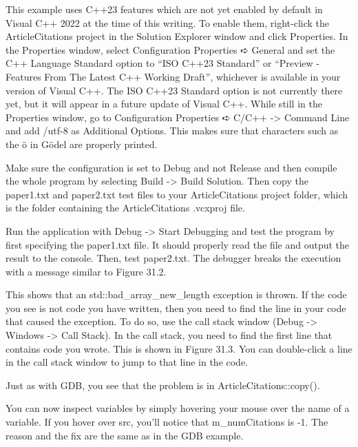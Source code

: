
This example uses C++23 features which are not yet enabled by default in Visual C++ 2022 at the time of this writing. To enable them, right-click the ArticleCitations project in the Solution Explorer window and click Properties. In the Properties window, select Configuration Properties ➪ General and set the C++ Language Standard option to “ISO C++23 Standard” or “Preview - Features From The Latest C++ Working Draft”, whichever is available in your version of Visual C++. The ISO C++23 Standard option is not currently there yet, but it will appear in a future update of Visual C++. While still in the Properties window, go to Configuration Properties ➪ C/C++ -> Command Line and add /utf-8 as Additional Options. This makes sure that characters such as the ö in Gödel are properly printed.

Make sure the configuration is set to Debug and not Release and then compile the whole program by selecting Build -> Build Solution. Then copy the paper1.txt and paper2.txt test files to your ArticleCitations project folder, which is the folder containing the ArticleCitations .vcxproj file.

Run the application with Debug -> Start Debugging and test the program by first specifying the paper1.txt file. It should properly read the file and output the result to the console. Then, test paper2.txt. The debugger breaks the execution with a message similar to Figure 31.2.


This shows that an std::bad\_array\_new\_length exception is thrown. If the code you see is not code you have written, then you need to find the line in your code that caused the exception. To do so, use the call stack window (Debug -> Windows -> Call Stack). In the call stack, you need to find the first line that contains code you wrote. This is shown in Figure 31.3. You can double-click a line in the call stack window to jump to that line in the code.


Just as with GDB, you see that the problem is in ArticleCitations::copy().

You can now inspect variables by simply hovering your mouse over the name of a variable. If you hover over src, you’ll notice that m\_numCitations is -1. The reason and the fix are the same as in the GDB example.


